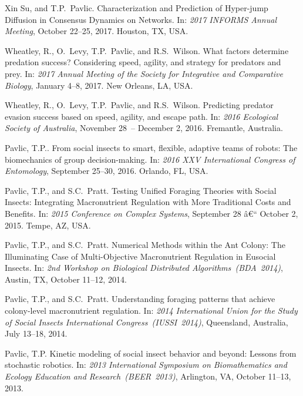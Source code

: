 \documentclass[10pt]{article}
\begin{document}
\begin{bibenum}
    \item Xin Su, and T.P.~Pavlic. Characterization and Prediction of
        Hyper-jump Diffusion in Consensus Dynamics on Networks. In:
        \emph{2017 INFORMS Annual Meeting}, October 22--25, 2017.
        Houston, TX, USA.

    \item Wheatley, R., O.~Levy, T.P.~Pavlic, and R.S.~Wilson. What
        factors determine predation success? Considering speed, agility,
        and strategy for predators and prey. In: \emph{2017
        Annual Meeting of the Society for Integrative and Comparative
        Biology}, January 4--8, 2017. New Orleans, LA, USA.

    \item Wheatley, R., O.~Levy, T.P.~Pavlic, and R.S.~Wilson.
        Predicting predator evasion success based on speed, agility, and
        escape path. In: \emph{2016 Ecological Society of Australia},
        November 28~-- December 2, 2016. Fremantle, Australia.

    \item Pavlic, T.P.. From social insects to smart, flexible, adaptive
        teams of robots: The biomechanics of group decision-making. In:
        \emph{2016 XXV International Congress of Entomology}, September
        25--30, 2016. Orlando, FL, USA.

    \item Pavlic, T.P., and S.C.~Pratt. Testing Unified Foraging
        Theories with Social Insects: Integrating Macronutrient
        Regulation with More Traditional Costs and Benefits. In:
        \emph{2015 Conference on Complex Systems}, September 28 â€“
        October 2, 2015. Tempe, AZ, USA.

    \item Pavlic, T.P., and S.C.~Pratt.
        Numerical Methods within the Ant Colony: The Illuminating Case
        of Multi-Objective Macronutrient Regulation in Eusocial Insects.
        In: \emph{2nd Workshop on Biological Distributed
        Algorithms~(BDA~2014)}, Austin, TX, October 11--12, 2014.

    \item Pavlic, T.P., and S.C.~Pratt. Understanding foraging patterns
        that achieve colony-level macronutrient regulation. In:
        \emph{2014 International Union for the Study of Social Insects
        International Congress~(IUSSI~2014)}, Queensland, Australia,
        July 13--18, 2014.

    \item Pavlic, T.P.
        Kinetic modeling of social insect behavior and beyond: Lessons
        from stochastic robotics. In: \emph{2013 International Symposium
        on Biomathematics and Ecology Education and
        Research~(BEER~2013)}, Arlington, VA, October 11--13, 2013.


\end{bibenum}
\end{document}
